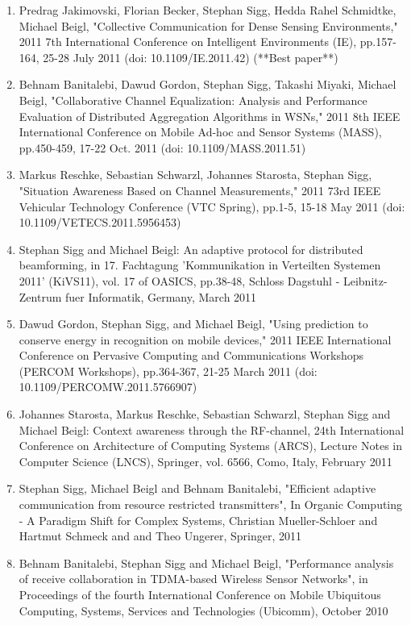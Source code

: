 \documentclass[10pt]{article}
\begin{document}
\begin{enumerate}
\item Predrag Jakimovski, Florian Becker, Stephan Sigg, Hedda Rahel Schmidtke, Michael Beigl, "Collective Communication for Dense Sensing Environments," 2011 7th International Conference on Intelligent Environments (IE), pp.157-164, 25-28 July 2011 (doi: 10.1109/IE.2011.42) (**Best paper**)
\item Behnam Banitalebi, Dawud Gordon, Stephan Sigg, Takashi Miyaki, Michael Beigl, "Collaborative Channel Equalization: Analysis and Performance Evaluation of Distributed Aggregation Algorithms in WSNs," 2011 8th IEEE International Conference on Mobile Ad-hoc and Sensor Systems (MASS), pp.450-459, 17-22 Oct. 2011 (doi: 10.1109/MASS.2011.51)
\item Markus Reschke, Sebastian Schwarzl, Johannes Starosta, Stephan Sigg, "Situation Awareness Based on Channel Measurements," 2011 73rd IEEE Vehicular Technology Conference (VTC Spring), pp.1-5, 15-18 May 2011 (doi: 10.1109/VETECS.2011.5956453)
\item Stephan Sigg and Michael Beigl: An adaptive protocol for distributed beamforming, in 17. Fachtagung 'Kommunikation in Verteilten Systemen 2011' (KiVS11), vol. 17 of OASICS, pp.38-48, Schloss Dagstuhl - Leibnitz-Zentrum fuer Informatik, Germany, March 2011
\item Dawud Gordon, Stephan Sigg, and Michael Beigl, "Using prediction to conserve energy in recognition on mobile devices," 2011 IEEE International Conference on Pervasive Computing and Communications Workshops (PERCOM Workshops), pp.364-367, 21-25 March 2011 (doi: 10.1109/PERCOMW.2011.5766907)
\item Johannes Starosta, Markus Reschke, Sebastian Schwarzl, Stephan Sigg and Michael Beigl: Context awareness through the RF-channel, 24th International Conference on Architecture of Computing Systems (ARCS), Lecture Notes in Computer Science (LNCS), Springer, vol. 6566, Como, Italy, February 2011
\item Stephan Sigg, Michael Beigl and Behnam Banitalebi, "Efficient adaptive communication from resource restricted transmitters", In Organic Computing - A Paradigm Shift for Complex Systems, Christian Mueller-Schloer and Hartmut Schmeck and and Theo Ungerer, Springer, 2011
\item Behnam Banitalebi, Stephan Sigg and Michael Beigl, "Performance analysis of receive collaboration in TDMA-based Wireless Sensor Networks", in Proceedings of the fourth International Conference on Mobile Ubiquitous Computing, Systems, Services and Technologies (Ubicomm), October 2010

\end{enumerate}
\end{document}
